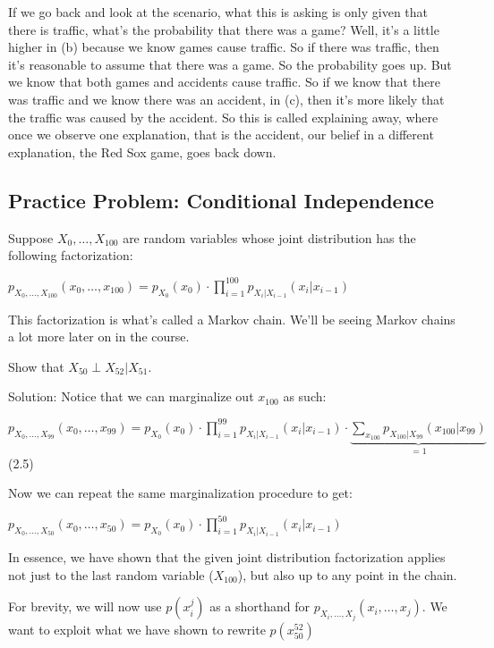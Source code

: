 \documentclass[6008notes.tex]{subfiles}
\begin{document}
If we go back and look at the scenario, what this is asking is only given that there is traffic, what's the probability that there was a game? Well, it's a little higher in (b) because we know games cause traffic. So if there was traffic, then it's reasonable to assume that there was a game. So the probability goes up. But we know that both games and accidents cause traffic. So if we know that there was traffic and we know there was an accident, in (c), then it's more likely that the traffic was caused by the accident. So this is called explaining away, where once we observe one explanation, that is the accident, our belief in a different explanation, the Red Sox game, goes back down.  

\subsection{Practice Problem: Conditional Independence}

Suppose $X_0, \dots , X_{100}$ are random variables whose joint distribution has the following factorization:

{\centering$p_{X_0, \dots , X_{100}}(x_0, \dots , x_{100}) = p_{X_0}(x_0) \cdot \prod _{i=1}^{100} p_{X_ i | X_{i-1}}(x_ i | x_{i-1})$ \par}
 
This factorization is what's called a Markov chain. We'll be seeing Markov chains a lot more later on in the course.

Show that $X_{50} \perp X_{52} | X_{51}$.

Solution: Notice that we can marginalize out $x_{100}$ as such:

{\centering$p_{X_0, \dots , X_{99}}(x_0, \dots , x_{99}) = p_{X_0}(x_0) \cdot \prod _{i=1}^{99} p_{X_ i | X_{i-1}}(x_ i | x_{i-1}) \cdot \underbrace{\sum _{x_{100}} p_{X_{100}|X_{99}}(x_{100}|x_{99})}_{= 1} \qquad\qquad$ (2.5) \par}
 
Now we can repeat the same marginalization procedure to get:

{\centering$p_{X_0, \dots , X_{50}}(x_0, \dots , x_{50}) = p_{X_0}(x_0) \cdot \prod _{i=1}^{50} p_{X_ i | X_{i-1}}(x_ i | x_{i-1})$ \par}

In essence, we have shown that the given joint distribution factorization applies not just to the last random variable ($X_{100}$), but also up to any point in the chain.

For brevity, we will now use $p(x_{i}^{j})$ as a shorthand for $p_{X_ i, \dots , X_{j}}(x_ i, \dots , x_{j})$. We want to exploit what we have shown to rewrite $p(x_{50}^{52})$
\end{document}
